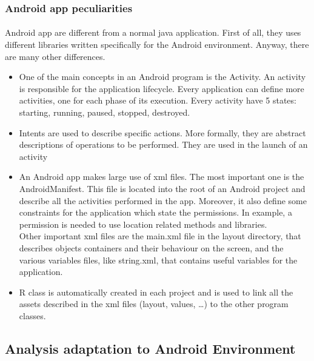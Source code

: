 \documentclass[letterpaper,twocolumn,10pt]{article}
\begin{document}
\subsubsection{Android app peculiarities~\cite{Burnette:2010:HAI:1893143}}
\paragraph{}
Android app are different from a normal java application. First of all, they uses different libraries written specifically for the Android environment. Anyway, there are many other differences.
\begin{itemize}
\item One of the main concepts in an Android program is the Activity. An activity is responsible for the application lifecycle. Every application can define more activities, one for each phase of its execution. Every activity have 5 states: starting, running, paused, stopped, destroyed. 
\item Intents are used to describe specific actions. More formally, they are abstract descriptions of operations to be performed. They are used in the launch of an activity~\cite{website:androiddev}
\item An Android app makes large use of xml files. The most important one is the AndroidManifest. This file is located into the root of an Android project and describe all the activities performed in the app. Moreover, it also define some constraints for the application which state the permissions. In example, a permission is needed to use location related methods and libraries.\\ Other important xml files are the main.xml file in the layout directory, that describes objects containers and their behaviour on the screen, and the various variables files, like string.xml, that contains useful variables for the application.
\item R class is automatically created in each project and is used to link all the assets described in the xml files (layout, values, \ldots) to the other program classes.
\end{itemize} 

\subsection{Analysis adaptation to Android Environment}
\end{document}
